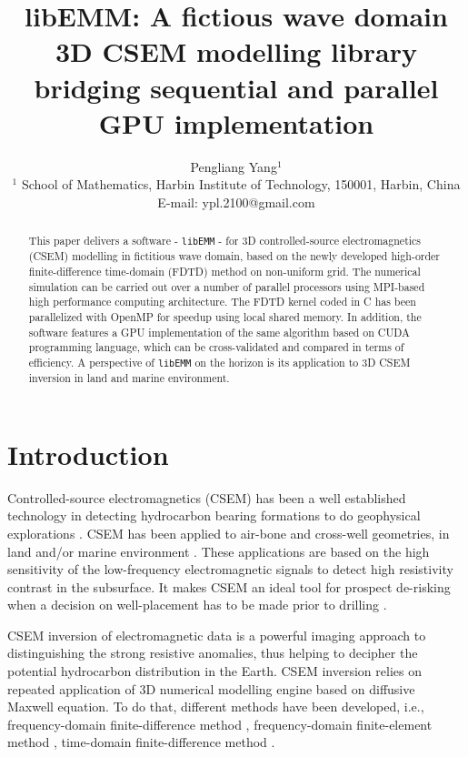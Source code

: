 \documentclass[a4paper,10pt]{article}
\title{libEMM: A fictious wave domain 3D CSEM modelling library bridging sequential and parallel GPU implementation}
\author{Pengliang Yang$^1$\\
  $^1$ School of Mathematics, Harbin Institute of Technology, 150001, Harbin, China\\
  E-mail: ypl.2100@gmail.com
}
\begin{document}
\maketitle

\begin{abstract}
  This paper delivers a software - \verb|libEMM| - for 3D controlled-source electromagnetics (CSEM) modelling in fictitious wave domain, based on the newly developed high-order finite-difference time-domain (FDTD) method on non-uniform grid. The numerical simulation can be carried out over a number of parallel processors using MPI-based high performance computing architecture. The FDTD kernel coded in C has been parallelized with OpenMP for speedup using local shared memory. In addition, the software features a GPU implementation of the same algorithm based on CUDA programming language, which can be cross-validated and compared in terms of efficiency. A perspective of \verb|libEMM| on the horizon is its application to 3D CSEM inversion in land and marine environment.
\end{abstract}


\section{Introduction}

Controlled-source electromagnetics (CSEM) has been a well established technology in detecting hydrocarbon bearing formations to do geophysical explorations \citep{chave1982on,constable1986offshore}. CSEM has been applied to air-bone \citep{yin2015review} and cross-well \citep{alumbaugh1997three} geometries, in land  \citep{ward1988electromagnetic,zhdanov1994geoelectrical,grayver2014geo} and/or marine environment \citep{eidesmo2002sbl,ellingsrud2002remote,constable2010,macgregor2014mcsem}. These applications are based on the high sensitivity of the low-frequency electromagnetic signals to detect high resistivity contrast in the subsurface. It makes CSEM an ideal tool for prospect de-risking \citep{macgregor2007derisking} when a decision on well-placement has to be made prior to drilling \citep{meju2019simple}.


CSEM inversion of electromagnetic data is a powerful imaging approach to distinguishing the strong resistive anomalies, thus helping to decipher the potential hydrocarbon distribution in the Earth. CSEM inversion relies on repeated application of  3D numerical modelling engine based on diffusive Maxwell equation. To do that, different methods have been developed, i.e., frequency-domain finite-difference method \citep{newman1995frequency,smith1996conservative1,mulder2006multigrid,streich20093d}, frequency-domain finite-element method \citep{li20072d,da2012finite,key2016mare2dem,rochlitz2019custem}, time-domain finite-difference method \citep{oristaglio1984diffusion,wang1993finite,Taflove_2005_CEF}.
\end{document}
